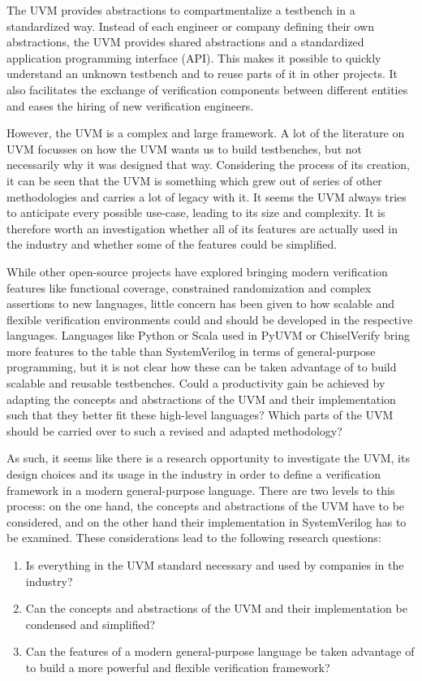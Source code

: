 \documentclass[11pt,a4paper]{report}
\begin{document}
The UVM provides abstractions to compartmentalize a testbench in a standardized way. Instead of each engineer or
company defining their own abstractions, the UVM provides shared abstractions and a standardized application
programming interface (API). This makes it possible to quickly
understand an unknown testbench and to reuse parts of it in other projects. It also facilitates the exchange of
verification components between different entities and eases the hiring of new verification engineers.

However, the UVM is a complex and large framework. A lot of the literature on UVM focusses on how the UVM wants us to
build testbenches, but not necessarily why it was designed that way. Considering the process of its creation, it can
be seen that the UVM is something which grew
out of series of other methodologies and carries a lot of legacy with it. It seems the UVM always tries to anticipate
every possible use-case, leading to its size and complexity. It is therefore worth an investigation whether all of
its features are actually used in the industry and whether some of the features could be simplified.

While other open-source projects have explored bringing modern verification features like functional coverage,
constrained randomization and complex assertions to new languages, little concern has been given to how scalable and
flexible verification environments could and should be developed in the respective languages. Languages like Python
or Scala used in PyUVM or ChiselVerify bring more features to the table than SystemVerilog in terms of
general-purpose programming, but it is not clear how these can be taken advantage of to build scalable and reusable
testbenches. Could a productivity gain be achieved by adapting the concepts and abstractions of the UVM and their
implementation such that they better fit these high-level languages? Which parts of the UVM should be carried over to
such a revised and adapted methodology?

As such, it seems like there is a research opportunity to investigate the UVM, its design choices and its usage in
the industry in order to define a verification framework in a modern general-purpose language. There are two levels
to this process: on the one hand, the concepts and abstractions of the UVM have to be considered, and on the other
hand their implementation in SystemVerilog has to be examined. These considerations lead to the following research questions:

\begin{enumerate}
  \item Is everything in the UVM standard necessary and used by companies in the industry?
  \item Can the concepts and abstractions of the UVM and their implementation be condensed and simplified?
  \item Can the features of a modern general-purpose language be taken advantage of to build a more powerful and
    flexible verification framework?
\end{enumerate}
\end{document}
